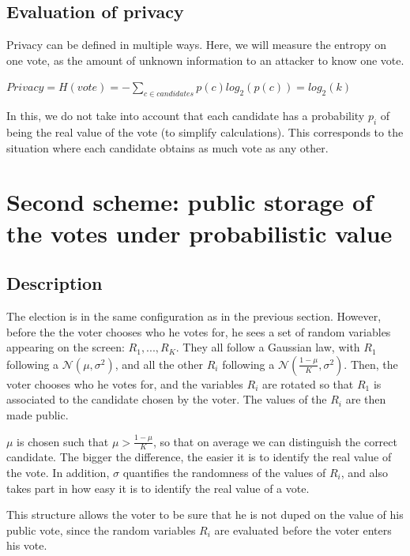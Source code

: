 \documentclass{article}
\begin{document}
\subsection{Evaluation of privacy}

Privacy can be defined in multiple ways. Here, we will measure the entropy on one vote, as the amount of unknown information to an attacker to know one vote.

$Privacy=H(vote)=-\sum\limits_{c \in candidates} p(c)log_2(p(c))=log_2(k)$

In this, we do not take into account that each candidate has a probability $p_i$ of being the real value of the vote (to simplify calculations). This corresponds to the situation where each candidate obtains as much vote as any other.


\section{Second scheme: public storage of the votes under probabilistic value}


\subsection{Description}

The election is in the same configuration as in the previous section. However, before the the voter chooses who he votes for, he sees a set of random variables appearing on the screen: $R_1, ..., R_K$. They all follow a Gaussian law, with $R_1$ following a $\mathcal{N}(\mu, \sigma^2)$, and all the other $R_i$ following a $\mathcal{N}(\frac{1-\mu}{K}, \sigma^2)$. Then, the voter chooses who he votes for, and the variables $R_i$ are rotated so that $R_1$ is associated to the candidate chosen by the voter. The values of the $R_i$ are then made public. 

$\mu$ is chosen such that $\mu > \frac{1-\mu}{K}$, so that on average we can distinguish the correct candidate. The bigger the difference, the easier it is to identify the real value of the vote. In addition, $\sigma$ quantifies the randomness of the values of $R_i$, and also takes part in how easy it is to identify the real value of a vote.

\bigbreak

This structure allows the voter to be sure that he is not duped on the value of his public vote, since the random variables $R_i$ are evaluated before the voter enters his vote.

\bigbreak
\end{document}
